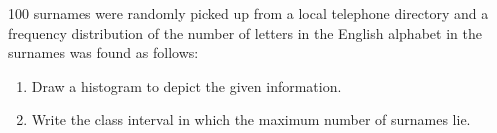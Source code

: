  100 surnames were randomly picked up from
a local telephone directory and a frequency
distribution of the number of letters in the
English alphabet in the surnames was found
as follows: 
\begin{table}[ht!]
\centering

\label{table:Q45}	
\end{table}
\begin{enumerate}
\item Draw a histogram to depict the given
information.
\item Write the class interval in which the
maximum number of surnames lie.
\end{enumerate}

